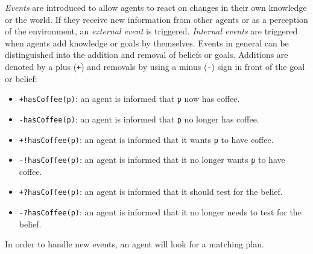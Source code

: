 \emph{Events} are introduced to allow agents to react on changes in their own knowledge or the world.
If they receive new information from other agents or as a perception of the environment, an \emph{external event} is triggered.
\emph{Internal events} are triggered when agents add knowledge or goals by themselves.
Events in general can be distinguished into the addition and removal of beliefs or goals.
Additions are denoted by a plus (\texttt{+}) and removals by using a minus (\texttt{-}) sign in front of the goal or belief:
\begin{itemize}
  \item \texttt{+hasCoffee(p)}: an agent is informed that \texttt{p} now has coffee.
  \item \texttt{-hasCoffee(p)}: an agent is informed that \texttt{p} no longer has coffee.
  \item \texttt{+!hasCoffee(p)}: an agent is informed that it wants \texttt{p} to have coffee.
  \item \texttt{-!hasCoffee(p)}: an agent is informed that it no longer wants \texttt{p} to have coffee.
  \item \texttt{+?hasCoffee(p)}: an agent is informed that it should test for the belief.
  \item \texttt{-?hasCoffee(p)}: an agent is informed that it no longer needs to test for the belief.
\end{itemize}
In order to handle new events, an agent will look for a matching plan.

